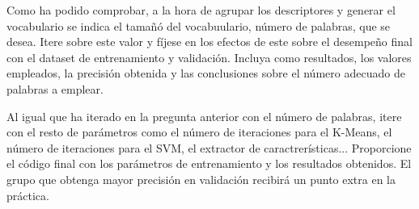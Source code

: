 \vspace{5mm}
\begin{tcolorbox}[colback=gray!10, colframe=gray!30, coltitle=black, title=Pregunta C.3: Cuantas palabras uso?, halign=left]
Como ha podido comprobar, a la hora de agrupar los descriptores y generar el vocabulario se indica el tamañó del vocabuulario, número de palabras, que se desea. Itere sobre este valor y fíjese en los efectos de este sobre el desempeño final con el dataset de entrenamiento y validación. Incluya como resultados, los valores empleados, la precisión obtenida y las conclusiones sobre el número adecuado de palabras a emplear.
\end{tcolorbox}
\vspace{5mm}

\begin{tcolorbox}[colback=gray!10, colframe=gray!30, coltitle=black, title=\textbf{EXTRA} - Pregunta C.4: En busca de los mejores parámetros, halign=left]
Al igual que ha iterado en la pregunta anterior con el número de palabras, itere con el resto de parámetros como el número de iteraciones para el K-Means, el número de iteraciones para el SVM, el extractor de caractrerísticas... Proporcione el código final con los parámetros de entrenamiento y los resultados obtenidos. El grupo que obtenga mayor precisión en validación recibirá un punto extra en la práctica.
\end{tcolorbox}
